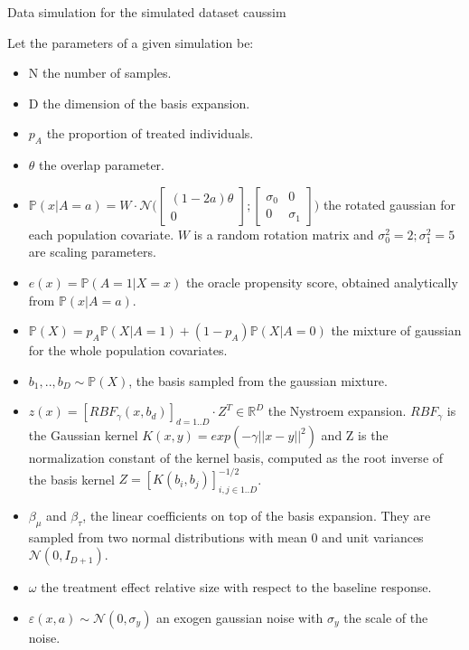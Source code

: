\documentclass[a4paper,num-refs]{oup-contemporary}%
\begin{document}
\begin{algorithm}
    \caption{Data simulation for the simulated dataset caussim}
    \label{apd:experiments:generation:algo}
    Let the parameters of a given simulation be:
    \begin{itemize}
        \item N the number of samples.
        \item D the dimension of the basis expansion.
        \item $p_A$ the proportion of treated individuals.
        \item $\theta$ the overlap parameter.
        \item $\mathbb P(x|A=a) = W \cdot \mathcal N \Big( \begin{bmatrix} (1-2a) \theta \\ 0\end{bmatrix} ; \begin{bmatrix} \sigma_0 & 0 \\ 0 & \sigma_1\end{bmatrix} \Big)$ the rotated gaussian for each population covariate. $W$ is a random rotation matrix and $\sigma_0^2=2;\sigma_1^2=5$ are scaling parameters.
        \item $e(x)=\mathbb P(A=1|X=x)$ the oracle propensity score, obtained analytically from $\mathbb P(x|A=a)$.
        \item $\mathbb P(X) = p_A \mathbb P(X|A=1) + (1- p_A) \mathbb P(X|A=0)$ the mixture of gaussian for the whole population covariates.
        \item $b_1, .., b_D \sim \mathbb P(X)$, the basis sampled from the gaussian mixture.
        \item $z(x) = [RBF_{\gamma}(x, b_d)]_{d=1..D} \cdot Z^T \in
                  \mathbb{R}^D$ the Nystroem expansion. $RBF_{\gamma}$ is the
              Gaussian kernel $K(x, y) = exp(-\gamma ||x-y||^2)$ and Z is the
              normalization constant of the kernel basis, computed as the root
              inverse of the basis kernel $Z=[K(b_i, b_j)]_{i, j \in
                  {1..D}}^{-1/2}$.
        \item $\beta_{\mu}$ and $\beta_{\tau}$, the linear coefficients on top of the basis expansion. They are sampled from two normal distributions with mean 0 and unit variances $\mathcal{N}(0, I_{D+1})$.
        \item $\omega$ the treatment effect relative size with respect to the baseline response.
        \item $\varepsilon(x, a) \sim \mathcal N(0, \sigma_y)$ an exogen gaussian noise with $\sigma_y$ the scale of the noise.
    \end{itemize}


\end{algorithm}
\end{document}
